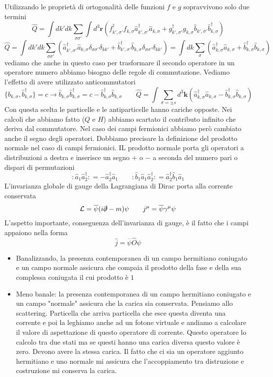 Utilizzando le proprietà di ortogonalità delle funzioni $f$ e $g$ sopravvivono solo due termini
$$
\hat{Q} = \int dk' dk \sum_{\sigma\sigma'} \int d^3\mathbf{r} (f_{k',\sigma'}^\dagger f_{k,\sigma} \hat{a}_{k',\sigma'}^\dagger \hat{a}_{k,\sigma} + g_{k',\sigma'}^\dagger g_{k,\sigma} \hat{b}_{k',\sigma'} \hat{b}_{k,\sigma}^\dagger)
$$
$$
\hat{Q} = \int dk' dk \sum_{\sigma\sigma'} (\hat{a}_{k',\sigma'}^\dagger \hat{a}_{k,\sigma} \delta_{\sigma\sigma'}\delta_{kk'} + \hat{b}_{k',\sigma'}^\dagger \hat{b}_{k,\sigma} \delta_{\sigma\sigma'}\delta_{kk'}) = \int dk \sum_{\sigma} (\hat{a}_{k,\sigma}^\dagger \hat{a}_{k,\sigma} + \hat{b}_{k,\sigma}^\dagger \hat{b}_{k,\sigma})
$$
vediamo che anche in questo caso per trasformare il secondo operatore in un operatore numero abbiamo bisogno delle regole di commutazione. Vediamo l'effetto di avere utilizzato anticommutatori
$$
\{\hat{b}_{k,\sigma}, \hat{b}_{k,\sigma}^\dagger\} = c \to \hat{b}_{k,\sigma} \hat{b}_{k,\sigma}^\dagger = c - \hat{b}_{k,\sigma}^\dagger \hat{b}_{k,\sigma} \qquad \hat{Q} = \int \sum_{\sigma=\pm s} d^3\mathbf{k} (\hat{a}_{k,\sigma}^\dagger \hat{a}_{k,\sigma} - \hat{b}_{k,\sigma}^\dagger \hat{b}_{k,\sigma})
$$
Con questa scelta le particelle e le antiparticelle hanno cariche opposte. Nei calcoli che abbiamo fatto ($Q$ e $H$) abbiamo scartato il contributo infinito che deriva dal commutatore. Nel caso dei campi fermionici abbiamo però cambiato anche il segno degli operatori. Dobbiamo precisare la definizione del prodotto normale nel caso di campi fermionici. IL prodotto normale porta gli operatori a distribuzioni a destra e inserisce un segno $+$ o $-$ a seconda del numero pari o dispari di permutazioni
$$
: \hat{a}_1 \hat{a}_2^\dagger : = - \hat{a}_2^\dagger \hat{a}_1 \qquad : \hat{b}_1 \hat{a}_1 \hat{a}_2^\dagger : = \hat{a}_2^\dagger \hat{b}_1 \hat{a}_1
$$
L'invarianza globale di gauge della Lagrangiana di Dirac porta alla corrente conservata
$$
\mathcal{L} = \overline{\psi}(i\slashed{\partial} - m)\psi \qquad j^\mu = \overline{\psi}\gamma^\mu\psi
$$
L'aspetto importante, conseguenza dell'invarianza di gauge, è il fatto che i campi appaiono nella forma
$$
\hat{j} = \overline{\psi}\hat{O}\psi
$$
\begin{itemize}
    \item Banalizzando, la presenza contemporanea di un campo hermitiano coniugato e un campo normale assicura che compaia il prodotto della fase e della sua complessa coniugata il cui prodotto è $1$
    \item Meno banale: la presenza contemporanea di un campo hermitiano coniugato e un campo "normale" assicura che la carica sia conservata. Pensiamo allo scattering. Particella che arriva particella che esce questa diventa una corrente e poi la leghiamo anche ad un fotone virtuale e andiamo a calcolare il valore di aspettazione di questo operatore di corrente. Questo operatore lo calcolo tra due stati ma se questi hanno una carica diversa questo valore è zero. Devono avere la stessa carica. Il fatto che ci sia un operatore aggiunto hermitiano e uno normale mi assicura che l'accoppiamento tra distruzione e costruzione mi conserva la carica.
\end{itemize}
